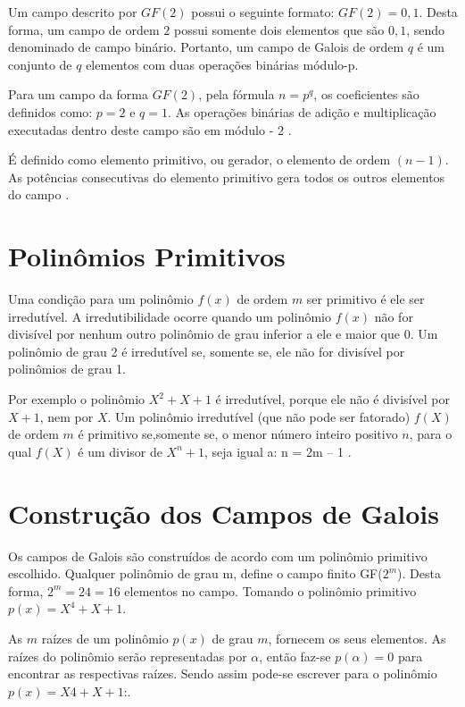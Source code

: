 Um campo descrito por $GF(2)$ possui o seguinte formato: $GF(2) = {0,1} $. Desta forma, um campo de ordem $2$ possui somente dois elementos que são ${0,1}$, sendo denominado de campo binário. Portanto, um campo de Galois de ordem $q$ é um conjunto de $q$ elementos com duas operações binárias módulo-p.

Para um campo da forma $GF(2)$, pela fórmula $n = p^{q}$, os coeficientes são definidos como: $p = 2$ e $q = 1$. As operações binárias de adição e multiplicação executadas dentro deste campo são em módulo - $2$ .

É definido como elemento primitivo, ou gerador, o elemento de ordem $(n - 1)$. As potências consecutivas do elemento primitivo gera todos os outros elementos do campo \cite{John2004}. 

\section{Polinômios Primitivos}\label{primitive:cap}

Uma condição para um polinômio $ f(x) $ de ordem $m$ ser primitivo é ele ser irredutível. A irredutibilidade ocorre quando um polinômio $ f(x) $ não for divisível por nenhum outro polinômio de grau inferior a ele e maior que 0. Um polinômio de grau 2 é irredutível se, somente se, ele não for divisível por polinômios de grau 1. 

Por exemplo o polinômio $ X^{2} + X + 1 $ é irredutível, porque ele não é divisível por $ X + 1 $, nem por $X$. Um polinômio irredutível (que não pode ser fatorado) $f(X)$ de ordem $m$ é primitivo se,somente se, o menor número inteiro positivo $n$, para o qual $f(X)$ é um divisor de $X^{n} + 1$, seja igual a: n = 2m – 1 \cite{Farrel2006}.

\section{Construção dos Campos de Galois}

Os campos de Galois são construídos de acordo com um polinômio primitivo escolhido. Qualquer polinômio de grau m, define o campo finito GF($2^{m}$). Desta forma, $2^{m} = 24 = 16$ elementos no campo. Tomando o polinômio primitivo $p(x) = X^{4} + X + 1$.

As $m$ raízes de um polinômio $p(x)$ de grau $m$, fornecem os seus elementos. As raízes do polinômio serão representadas por $\alpha$, então faz-se $p(\alpha) = 0$ para encontrar as respectivas raízes. Sendo assim pode-se escrever para o polinômio $p(x) = X4 + X + 1$:.

